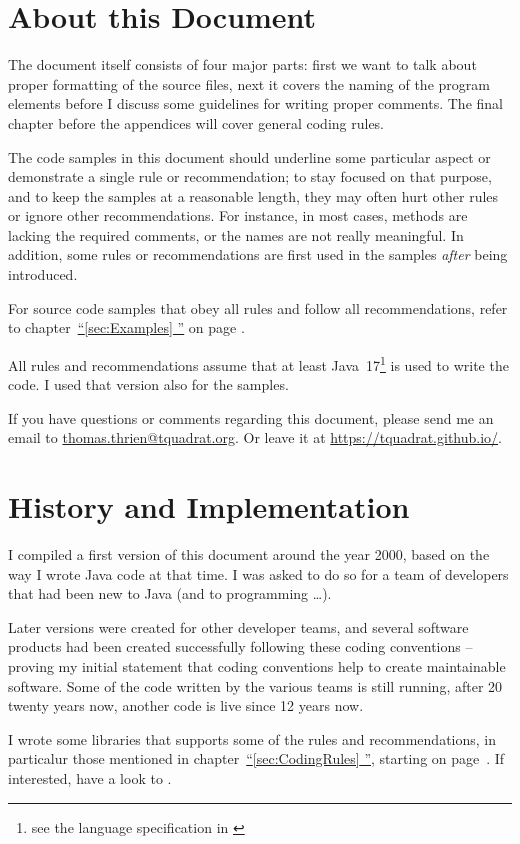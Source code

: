 \documentclass[12pt,a4paper,titlepage, parskip=half, headsepline, footsepline, cleardoubleplain]{scrbook}
\newcommand*{\tqfullref}[1]{\hyperref[{#1}]{“\ref*{#1} \nameref*{#1}”}}
\newcommand*{\tqfullvref}[1]{\hyperref[{#1}]{“\ref*{#1} \nameref*{#1}”} on page \pageref{#1}}
\begin{document}
\section{About this Document}
The document itself consists of four major parts: first we want to talk about proper formatting of the source files, next it covers the naming of the program elements before I discuss some guidelines for writing proper comments. The final chapter before the appendices will cover general coding rules.

The code samples in this document should underline some particular aspect or demonstrate a single rule or recommendation; to stay focused on that purpose, and to keep the samples at a reasonable length, they may often hurt other rules or ignore other recommendations. For instance, in most cases, methods are lacking the required comments, or the names are not really meaningful. In addition, some rules or recommendations are first used in the samples \textit{after} being introduced.

For source code samples that obey all rules and follow all recommendations, refer to chapter~\tqfullvref{sec:Examples}.

All rules and recommendations assume that at least Java~17\footnote{see the language specification in \autocite{ORACLE_DOC_LANGUAGE_SPECIFICATION}} is used to write the code. I used that version also for the samples.

If you have questions or comments regarding this document, please send me an email to \href{mailto:thomas.thrien@tquadrat.org}{thomas.thrien@tquadrat.org}. Or leave it at \url{https://tquadrat.github.io/}.

\section{History and Implementation}
I compiled a first version of this document around the year 2000, based on the way I wrote Java code at that time. I was asked to do so for a team of developers that had been new to Java (and to programming …).

Later versions were created for other developer teams, and several software products had been created successfully following these coding conventions – proving my initial statement that coding conventions help to create maintainable software. Some of the code written by the various teams is still running, after 20 twenty years now, another code is live since 12 years now.

I wrote some libraries that supports some of the rules and recommendations, in particalur those mentioned in chapter~\tqfullref{sec:CodingRules}, starting on page~\pageref{sec:CodingRules}. If interested, have a look to \autocite{TQUADRAT_ORG}.
\end{document}
